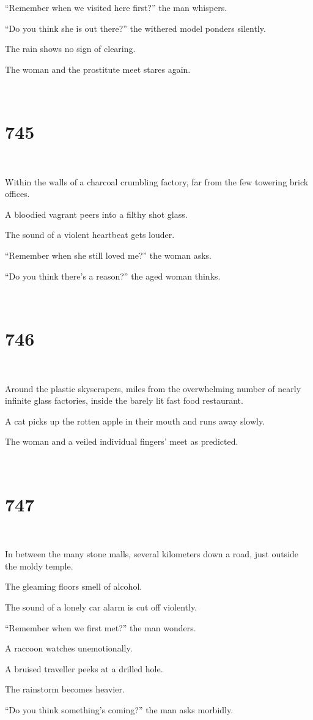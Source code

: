 \documentclass{report}
\begin{document}
``Remember when we visited here first?'' the man whispers.

``Do you think she is out there?'' the withered model ponders silently.

The rain shows no sign of clearing.

The woman and the prostitute meet stares again.

~
\chapter*{745}
~

Within the walls of a charcoal crumbling factory, far from the few towering brick offices.

A bloodied vagrant peers into a filthy shot glass.

The sound of a violent heartbeat gets louder.

``Remember when she still loved me?'' the woman asks.

``Do you think there's a reason?'' the aged woman thinks.

~
\chapter*{746}
~

Around the plastic skyscrapers, miles from the overwhelming number of nearly infinite glass factories, inside the barely lit fast food restaurant.

A cat picks up the rotten apple in their mouth and runs away slowly.

The woman and a veiled individual fingers' meet as predicted.

~
\chapter*{747}
~

In between the many stone malls, several kilometers down a road, just outside the moldy temple.

The gleaming floors smell of alcohol.

The sound of a lonely car alarm is cut off violently.

``Remember when we first met?'' the man wonders.

A raccoon watches unemotionally.

A bruised traveller peeks at a drilled hole.

The rainstorm becomes heavier.

``Do you think something's coming?'' the man asks morbidly.
\end{document}
